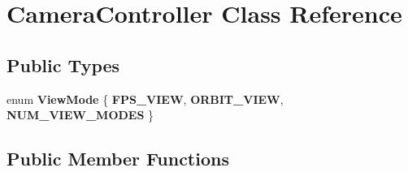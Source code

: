 \hypertarget{class_camera_controller}{
\section{CameraController Class Reference}
\label{class_camera_controller}
}
\subsection*{Public Types}
\begin{DoxyCompactItemize}
\item 
enum {\bfseries ViewMode} \{ {\bfseries FPS\_\-VIEW}, 
{\bfseries ORBIT\_\-VIEW}, 
{\bfseries NUM\_\-VIEW\_\-MODES}
 \}
\end{DoxyCompactItemize}
\subsection*{Public Member Functions}
